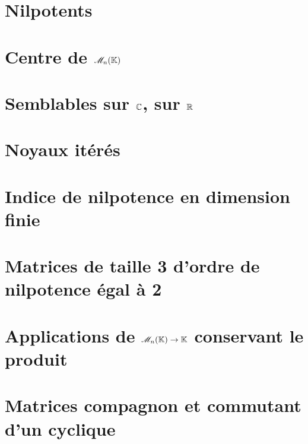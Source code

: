 \section{Nilpotents}


\section{Centre de \texorpdfstring{$\mathscr{M}_n(\mathbb{K})$}{l'espace des matrices carrées}}


\section{Semblables sur \texorpdfstring{$\mathbb{C}$, sur $\mathbb{R}$}{C, sur R}}


\section{Noyaux itérés}


\section{Indice de nilpotence en dimension finie} \label{indice_nilpotence}


\section{Matrices de taille 3 d'ordre de nilpotence égal à 2}


\section{Applications de \texorpdfstring{$\mathscr{M}_n(\mathbb{K}) \to \mathbb{K}$}{l'espace des matrices carrées dans le corps K} conservant le produit}


\section{Matrices compagnon et commutant d'un cyclique}


